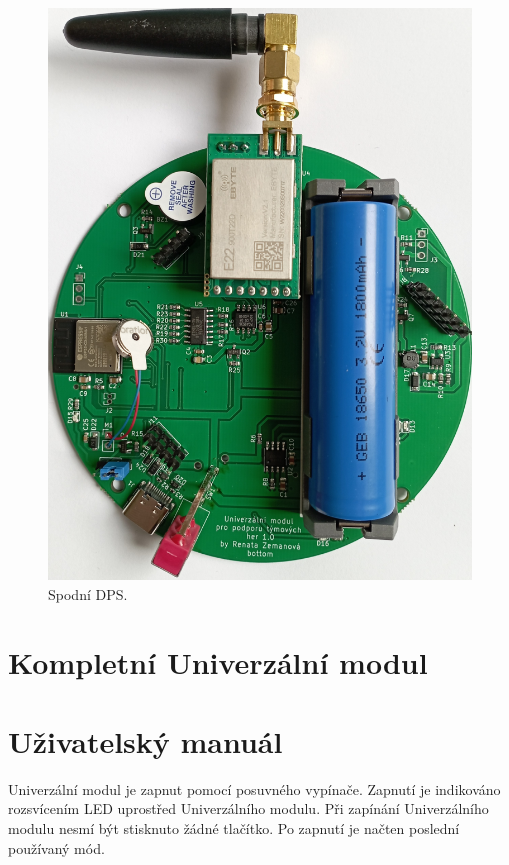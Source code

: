 \begin{figure}[!h]
	\begin{center}
	  \includegraphics[scale=0.22]{obrazky/DPS_final_spodni.jpg}
	\end{center}
	\caption[Spodní DPS]{Spodní DPS.}
\end{figure}

\chapter{Kompletní Univerzální modul}


\chapter{Uživatelský manuál}
Univerzální modul je zapnut pomocí posuvného vypínače. Zapnutí je indikováno rozsvícením LED uprostřed Univerzálního modulu. Při zapínání Univerzálního modulu nesmí být stisknuto žádné tlačítko. Po zapnutí je načten 
poslední používaný mód. 

